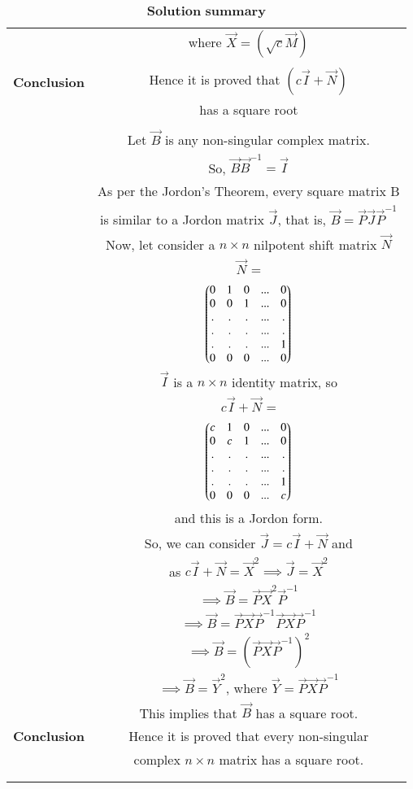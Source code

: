 \documentclass[journal,12pt,onecolumn]{IEEEtran}
\begin{document}
\begin{longtable}{|c|c|}
& where $\vec{X} = (\sqrt{c}\vec{M})$\\
& \\
\hline
\textbf{Conclusion} & Hence it is proved that $(c\vec{I}+\vec{N})$\\
& has a square root\\
\hline
\multirow{3}{*}{} & \\
\textbf{Proof 2} & Let $\vec{B}$ is any non-singular complex matrix.\\
& So, $\vec{B}\vec{B}^{-1}= \vec{I}$\\
& As per the Jordon's Theorem, every square matrix B\\
&  is similar to a Jordon matrix $\vec{J}$, that is, $\vec{B}=\vec{P}\vec{J}\vec{P}^{-1}$\\
& Now, let consider a $n \times n$ nilpotent shift matrix $\vec{N}$\\
& $\vec{N}$ = \\
& $\begin{pmatrix}0 & 1 &0 &...& 0\\0 & 0 & 1& ...& 0\\.&.&.&...&.\\.&.&.&...&.\\.&.&.&...&1\\0 & 0 &0 &...& 0\end{pmatrix}$\\
& $\vec{I}$ is a $n \times n$ identity matrix, so \\
& $c\vec{I}+\vec{N}$ = \\
& $\begin{pmatrix}c & 1 &0 &...& 0\\0 & c & 1& ...& 0\\.&.&.&...&.\\.&.&.&...&.\\.&.&.&...&1\\0 & 0 &0 &...& c\end{pmatrix}$\\
& and this is a Jordon form.\\
& So, we can consider $\vec{J} = c\vec{I}+\vec{N}$ and \\
& as $c\vec{I}+\vec{N}= \vec{X}^2 \implies \vec{J}=\vec{X}^2$ \\
& $\implies \vec{B}=\vec{P}\vec{X}^2\vec{P}^{-1}$\\
& $\implies \vec{B}=\vec{P}\vec{X}\vec{P}^{-1}\vec{P}\vec{X}\vec{P}^{-1}$\\
& $\implies \vec{B}=(\vec{P}\vec{X}\vec{P}^{-1})^2$\\
& $\implies \vec{B}=\vec{Y}^2$, where $\vec{Y} = \vec{P}\vec{X}\vec{P}^{-1}$\\
& This implies that $\vec{B}$ has a square root.\\
\hline
\textbf{Conclusion} & Hence it is proved that every non-singular \\
& complex $n \times n$ matrix has a square root.\\
& \\
\hline
\caption{$\textbf{Solution summary}$}
\label{table:1}
\end{longtable}
\end{document}
